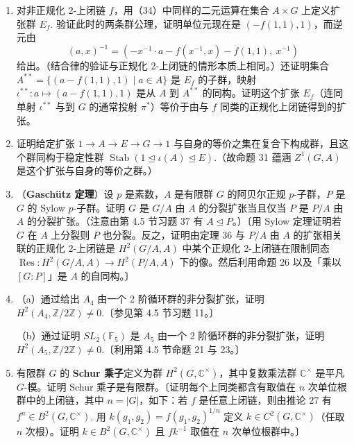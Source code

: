 \begin{enumerate}
\item 对非正规化 2-上闭链 \(f\)，用（34）中同样的二元运算在集合 \(A \times G\) 上定义扩张群 \(E_f\). 验证此时的两条群公理，证明单位元现在是 \((-f(1,1), 1)\)，而逆元由
\[
(a, x)^{-1} = (-x^{-1} \cdot a-f(x^{-1}, x)-f(1,1),\ x^{-1})
\]
给出。（结合律的验证与正规化 2-上闭链的情形本质上相同。）还证明集合 \(A^{**} = \{(a-f(1,1), 1) \mid a \in A\}\) 是 \(E_f\) 的子群，映射 \(\iota^{**} : a \mapsto (a-f(1,1),1)\) 是从 \(A\) 到 \(A^{**}\) 的同构。证明这个扩张 \(E_f\)（连同单射 \(\iota^{**}\) 与到 \(G\) 的通常投射 \(\pi^*\)）等价于由与 \(f\) 同类的正规化上闭链得到的扩张。

\item 证明给定扩张 \(1 \to A \to E \to G \to 1\) 与自身的等价之集在复合下构成群，且这个群同构于稳定性群 \(\operatorname{Stab}(1 \trianglelefteq \iota(A) \trianglelefteq E)\).（故命题 31 蕴涵 \(Z^1(G, A)\) 是这个扩张与自身的等价之群。）

\item （\textbf{Gaschütz 定理}）设 \(p\) 是素数，\(A\) 是有限群 \(G\) 的阿贝尔正规 \(p\)-子群，\(P\) 是 \(G\) 的 Sylow \(p\)-子群。证明 \(G\) 是 \(G/A\) 由 \(A\) 的分裂扩张当且仅当 \(P\) 是 \(P/A\) 由 \(A\) 的分裂扩张。（注意由第 4.5 节习题 37 有 \(A \trianglelefteq P\)。）〔用 Sylow 定理证明若 \(G\) 在 \(A\) 上分裂则 \(P\) 也分裂。反之，证明由定理 36 与 \(P/A\) 由 \(A\) 的扩张相关联的正规化 2-上闭链是 \(H^2(G/A, A)\) 中某个正规化 2-上闭链在限制同态 \(\operatorname{Res} : H^2(G/A, A) \to H^2(P/A, A)\) 下的像。然后利用命题 26 以及「乘以 \([G:P]\)」是 \(A\) 的自同构。〕

\item （a）通过给出 \(A_4\) 由一个 2 阶循环群的非分裂扩张，证明 \(H^2(A_4, \mathbb{Z}/2\mathbb{Z}) \neq 0\).〔参见第 4.5 节习题 11。〕

（b）通过证明 \(SL_2(\mathbb{F}_5)\) 是 \(A_5\) 由一个 2 阶循环群的非分裂扩张，证明 \(H^2(A_5, \mathbb{Z}/2\mathbb{Z}) \neq 0\).〔利用第 4.5 节命题 21 与 23。〕

\item 有限群 \(G\) 的 \textbf{Schur 乘子}定义为群 \(H^2(G, \mathbb{C}^\times)\)，其中复数乘法群 \(\mathbb{C}^\times\) 是平凡 \(G\)-模。证明 Schur 乘子是有限群。〔证明每个上同类都含有取值在 \(n\) 次单位根群中的上闭链，其中 \(n = |G|\)，如下：若 \(f\) 是任意上闭链，则由推论 27 有 \(f^n \in B^2(G, \mathbb{C}^\times)\). 用 \(k(g_1,g_2) = f(g_1,g_2)^{1/n}\) 定义 \(k \in C^2(G, \mathbb{C}^\times)\)（任取 \(n\) 次根）。证明 \(k \in B^2(G, \mathbb{C}^\times)\) 且 \(fk^{-1}\) 取值在 \(n\) 次单位根群中。〕


\end{enumerate}
